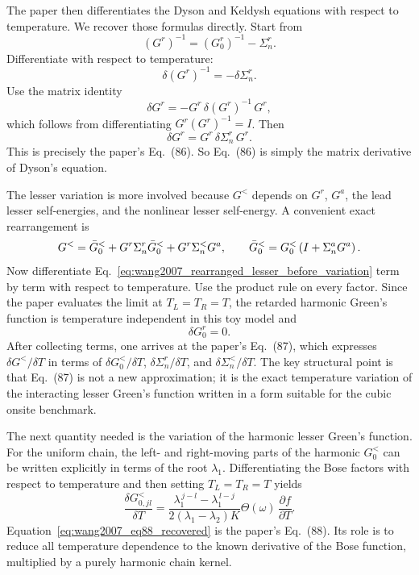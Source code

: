 The paper then differentiates the Dyson and Keldysh equations with respect to temperature. We recover those formulas directly. Start from
\begin{equation}
    (G^r)^{-1} = (G_0^r)^{-1} - \Sigma_n^r.
\end{equation}
Differentiate with respect to temperature:
\begin{equation}
    \delta (G^r)^{-1} = -\delta\Sigma_n^r.
\end{equation}
Use the matrix identity
\begin{equation}
    \delta G^r = -G^r\,\delta (G^r)^{-1}\,G^r,
\end{equation}
which follows from differentiating $G^r(G^r)^{-1}=I$. Then
\begin{equation}
    \delta G^r = G^r\,\delta\Sigma_n^r\,G^r.
    \label{eq:wang2007_eq86_recovered}
\end{equation}
This is precisely the paper's Eq.~(86). So Eq.~(86) is simply the matrix derivative of Dyson's equation.

The lesser variation is more involved because $G^<$ depends on $G^r$, $G^a$, the lead lesser self-energies, and the nonlinear lesser self-energy. A convenient exact rearrangement is
\begin{equation}
    G^<
    =
    \bar G_0^<
    +
    G^r\Sigma_n^r\bar G_0^<
    +
    G^r\Sigma_n^<G^a,
    \qquad
    \bar G_0^< = G_0^<\left( I+\Sigma_n^a G^a \right).
    \label{eq:wang2007_rearranged_lesser_before_variation}
\end{equation}
Now differentiate Eq.~\eqref{eq:wang2007_rearranged_lesser_before_variation} term by term with respect to temperature. Use the product rule on every factor. Since the paper evaluates the limit at $T_L=T_R=T$, the retarded harmonic Green's function is temperature independent in this toy model and
\begin{equation}
    \delta G_0^r = 0.
    \label{eq:wang2007_deltaG0r_zero}
\end{equation}
After collecting terms, one arrives at the paper's Eq.~(87), which expresses $\delta G^</\delta T$ in terms of $\delta G_0^</\delta T$, $\delta\Sigma_n^r/\delta T$, and $\delta\Sigma_n^</\delta T$. The key structural point is that Eq.~(87) is not a new approximation; it is the exact temperature variation of the interacting lesser Green's function written in a form suitable for the cubic onsite benchmark.

The next quantity needed is the variation of the harmonic lesser Green's function. For the uniform chain, the left- and right-moving parts of the harmonic $G_0^<$ can be written explicitly in terms of the root $\lambda_1$. Differentiating the Bose factors with respect to temperature and then setting $T_L=T_R=T$ yields
\begin{equation}
    \frac{\delta G_{0,jl}^<}{\delta T}
    =
    \frac{\lambda_1^{\,j-l} - \lambda_1^{\,l-j}}{2(\lambda_1-\lambda_2)K}
    \Theta(\omega)\,
    \frac{\partial f}{\partial T}.
    \label{eq:wang2007_eq88_recovered}
\end{equation}
Equation~\eqref{eq:wang2007_eq88_recovered} is the paper's Eq.~(88). Its role is to reduce all temperature dependence to the known derivative of the Bose function, multiplied by a purely harmonic chain kernel.

